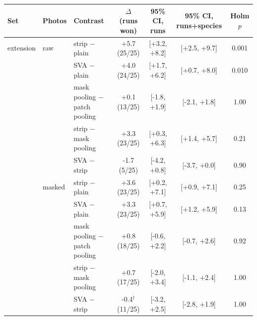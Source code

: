 \begin{tabular}{lllcccc}
\toprule
Set & Photos & Contrast & $\Delta$ (runs won) & 95\% CI, runs & 95\% CI, runs+species & Holm $p$ \\
\midrule
extension & raw & strip $-$ plain & +5.7 (25/25) & [+3.2, +8.2] & [+2.5, +9.7] & 0.001 \\
 &  & SVA $-$ plain & +4.0 (24/25) & [+1.7, +6.2] & [+0.7, +8.0] & 0.010 \\
 &  & mask pooling $-$ patch pooling & +0.1 (13/25) & [-1.8, +1.9] & [-2.1, +1.8] & 1.00 \\
 &  & strip $-$ mask pooling & +3.3 (23/25) & [+0.3, +6.3] & [+1.4, +5.7] & 0.21 \\
 &  & SVA $-$ strip & -1.7 (5/25) & [-4.2, +0.8] & [-3.7, +0.0] & 0.90 \\
\midrule
 & masked & strip $-$ plain & +3.6 (23/25) & [+0.2, +7.1] & [+0.9, +7.1] & 0.25 \\
 &  & SVA $-$ plain & +3.3 (23/25) & [+0.7, +5.9] & [+1.2, +5.9] & 0.13 \\
 &  & mask pooling $-$ patch pooling & +0.8 (18/25) & [-0.6, +2.2] & [-0.7, +2.6] & 0.92 \\
 &  & strip $-$ mask pooling & +0.7 (17/25) & [-2.0, +3.4] & [-1.1, +2.4] & 1.00 \\
 &  & SVA $-$ strip & -0.4$^\dagger$ (11/25) & [-3.2, +2.5] & [-2.8, +1.9] & 1.00 \\
\bottomrule
\end{tabular}